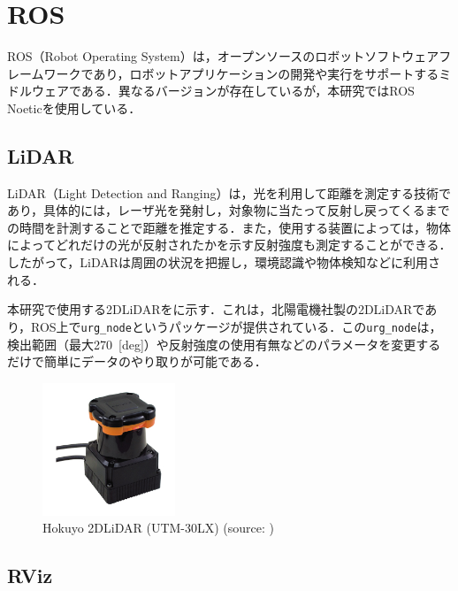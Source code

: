 
\section{ROS}

ROS（Robot Operating System）\cite{ros}は，オープンソースのロボットソフトウェアフレームワークであり，ロボットアプリケーションの開発や実行をサポートするミドルウェアである．異なるバージョンが存在しているが，本研究ではROS Noeticを使用している．

\subsection{LiDAR}

  LiDAR（Light Detection and Ranging）は，光を利用して距離を測定する技術であり，具体的には，レーザ光を発射し，対象物に当たって反射し戻ってくるまでの時間を計測することで距離を推定する．また，使用する装置によっては，物体によってどれだけの光が反射されたかを示す反射強度も測定することができる．したがって，LiDARは周囲の状況を把握し，環境認識や物体検知などに利用される．

  本研究で使用する2DLiDARをに示す．これは，北陽電機社製の2DLiDARであり，ROS上で\texttt{urg\_node}\cite{urg_node}というパッケージが提供されている．この\texttt{urg\_node}は，検出範囲（最大270 \,[deg]）や反射強度の使用有無などのパラメータを変更するだけで簡単にデータのやり取りが可能である．

  \begin{figure}[h]
    \centering
    \includegraphics[keepaspectratio, scale=0.80] {images/RobotGuidance_hokuyo_lidar.png}
    \caption[Hokuyo 2DLiDAR (UTM-30LX)]{Hokuyo 2DLiDAR (UTM-30LX) (source: \cite{hokuyo})}
    \label{Fig:hokuyo_lidar}
  \end{figure}

\newpage

\subsection{RViz}

